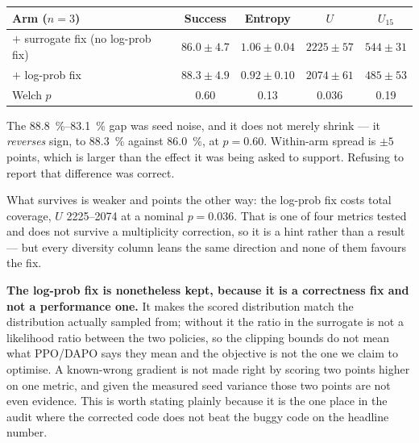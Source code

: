 \begin{center}
\begin{tabular}{@{}lcccc@{}}
\toprule
\textbf{Arm ($n=3$)} & \textbf{Success} & \textbf{Entropy} & $U$ & $U_{15}$ \\
\midrule
$+$ surrogate fix (no log-prob fix) & $86.0 \pm 4.7$ & $1.06 \pm 0.04$ &
  $2225 \pm 57$ & $544 \pm 31$ \\
$+$ log-prob fix                    & $88.3 \pm 4.9$ & $0.92 \pm 0.10$ &
  $2074 \pm 61$ & $485 \pm 53$ \\
\midrule
Welch $p$                           & 0.60 & 0.13 & 0.036 & 0.19 \\
\bottomrule
\end{tabular}
\end{center}

The \SIrange{88.8}{83.1}{\percent} gap was seed noise, and it does not merely
shrink --- it \emph{reverses} sign, to \SI{88.3}{\percent} against
\SI{86.0}{\percent}, at $p = 0.60$. Within-arm spread is ${\pm}5$ points, which
is larger than the effect it was being asked to support. Refusing to report that
difference was correct.

What survives is weaker and points the other way: the log-prob fix costs total
coverage, $U$ \numrange{2225}{2074} at a nominal $p = 0.036$. That is one of four
metrics tested and does not survive a multiplicity correction, so it is a hint
rather than a result --- but every diversity column leans the same direction and
none of them favours the fix.

\textbf{The log-prob fix is nonetheless kept, because it is a correctness fix
and not a performance one.} It makes the scored distribution match the
distribution actually sampled from; without it the ratio in the surrogate is not
a likelihood ratio between the two policies, so the clipping bounds do not mean
what PPO/DAPO says they mean and the objective is not the one we claim to
optimise. A known-wrong gradient is not made right by scoring two points higher
on one metric, and given the measured seed variance those two points are not
even evidence. This is worth stating plainly because it is the one place in the
audit where the corrected code does not beat the buggy code on the headline
number.


